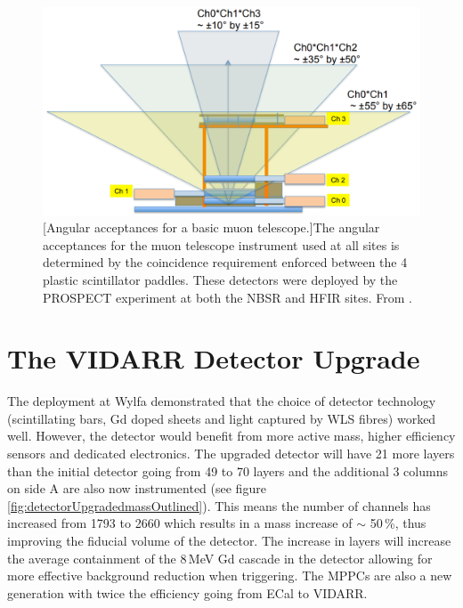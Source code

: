 \begin{figure}[!h]
 \centering
 \includegraphics[width=0.7\linewidth]{Chapter2/Figs/Raster/Prospect_MuonPaddels.png}
 [Angular acceptances for a basic muon telescope.]{The angular acceptances for the muon telescope instrument used at all sites is determined by the coincidence requirement enforced between the 4 plastic scintillator paddles. These detectors were deployed by the PROSPECT experiment at both the NBSR and HFIR sites. From \cite{Ashenfelter_2016}.} 
 \label{fig:Prospect_MuonPaddels}
\end{figure}

\clearpage
\section{The VIDARR Detector Upgrade}\label{sec:theUpgradedDetector}
The deployment at Wylfa demonstrated that the choice of detector technology (scintillating bars, Gd doped sheets and light captured by WLS fibres) worked well. However, the detector would benefit from more active mass, higher efficiency sensors and dedicated electronics. The upgraded detector will have 21 more layers than the initial detector going from 49 to 70 layers and the additional 3 columns on side A are also now instrumented (see figure \ref{fig:detectorUpgradedmassOutlined}). This means the number of channels has increased from 1793 to 2660 which results in a mass increase of $\sim$ 50\,\%, thus improving the fiducial volume of the detector. The increase in layers will increase the average containment of the 8\,MeV Gd cascade in the detector allowing for more effective background reduction when triggering. The MPPCs are also a new generation with twice the efficiency going from ECal to VIDARR. %

